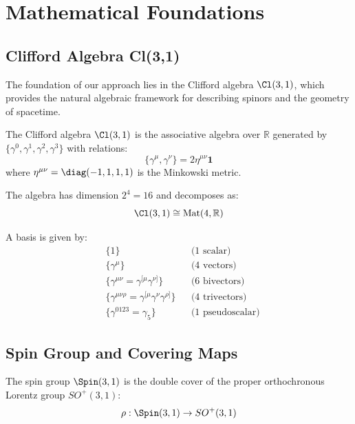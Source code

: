 \section{Mathematical Foundations}
\label{sec:math}

\subsection{Clifford Algebra Cl(3,1)}

The foundation of our approach lies in the Clifford algebra $\Cl(3,1)$, which provides the natural algebraic framework for describing spinors and the geometry of spacetime.

\begin{definition}
The Clifford algebra $\Cl(3,1)$ is the associative algebra over $\mathbb{R}$ generated by $\{\gamma^0, \gamma^1, \gamma^2, \gamma^3\}$ with relations:
\begin{equation}
    \{\gamma^\mu, \gamma^\nu\} = 2\eta^{\mu\nu} \mathbf{1}
\end{equation}
where $\eta^{\mu\nu} = \diag(-1, 1, 1, 1)$ is the Minkowski metric.
\end{definition}

The algebra has dimension $2^4 = 16$ and decomposes as:
\begin{equation}
    \Cl(3,1) \cong \text{Mat}(4, \mathbb{R})
\end{equation}

A basis is given by:
\begin{align}
    &\{1\} && \text{(1 scalar)} \\
    &\{\gamma^\mu\} && \text{(4 vectors)} \\
    &\{\gamma^{\mu\nu} = \gamma^{[\mu}\gamma^{\nu]}\} && \text{(6 bivectors)} \\
    &\{\gamma^{\mu\nu\rho} = \gamma^{[\mu}\gamma^\nu\gamma^{\rho]}\} && \text{(4 trivectors)} \\
    &\{\gamma^{0123} = \gamma_5\} && \text{(1 pseudoscalar)}
\end{align}

\subsection{Spin Group and Covering Maps}

The spin group $\Spin(3,1)$ is the double cover of the proper orthochronous Lorentz group $SO^+(3,1)$:
\begin{equation}
    \rho: \Spin(3,1) \to SO^+(3,1)
\end{equation}

